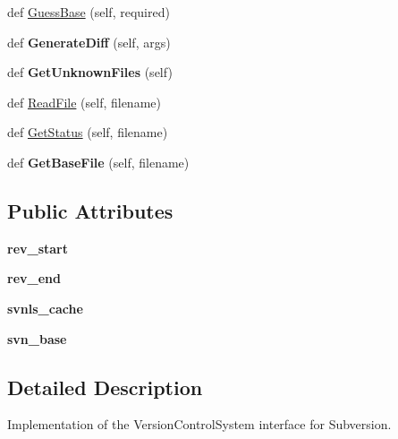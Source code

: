 \begin{DoxyCompactItemize}
def \hyperlink{classupload_1_1SubversionVCS_a7d22d459469a757270502ce0dccacbd2}{Guess\+Base} (self, required)
\item 
\mbox{\label{classupload_1_1SubversionVCS_a07c2d341f2c7df2772dd7f85e89b0212}} 
def {\bfseries Generate\+Diff} (self, args)
\item 
\mbox{\label{classupload_1_1SubversionVCS_a494ba1010992d83cac015bc396ab693a}} 
def {\bfseries Get\+Unknown\+Files} (self)
\item 
def \hyperlink{classupload_1_1SubversionVCS_a340d269b74386ac863636f6b0683d9f4}{Read\+File} (self, filename)
\item 
def \hyperlink{classupload_1_1SubversionVCS_ac3785eb1fa561088206d01570f9fe982}{Get\+Status} (self, filename)
\item 
\mbox{\label{classupload_1_1SubversionVCS_a29dec4941de0824734d6842a2f33ffc3}} 
def {\bfseries Get\+Base\+File} (self, filename)
\end{DoxyCompactItemize}
\subsection*{Public Attributes}
\begin{DoxyCompactItemize}
\item 
\mbox{\label{classupload_1_1SubversionVCS_ad1553a69f4a790309273dbdeb9077732}} 
{\bfseries rev\+\_\+start}
\item 
\mbox{\label{classupload_1_1SubversionVCS_ac0bb07a099c722b7f8622de4b225904f}} 
{\bfseries rev\+\_\+end}
\item 
\mbox{\label{classupload_1_1SubversionVCS_aa801782f807674b06f491df5d7ca9942}} 
{\bfseries svnls\+\_\+cache}
\item 
\mbox{\label{classupload_1_1SubversionVCS_a60645c40d2fea4cd52881576bd13341f}} 
{\bfseries svn\+\_\+base}
\end{DoxyCompactItemize}


\subsection{Detailed Description}
\begin{DoxyVerb}Implementation of the VersionControlSystem interface for Subversion.\end{DoxyVerb}
 

